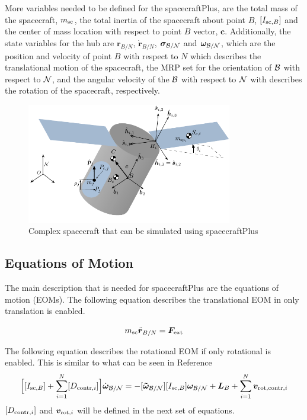 More variables needed to be defined for the spacecraftPlus, are the total mass of the spacecraft, $m_{\textnormal{sc}}$, the total inertia of the spacecraft about point $B$,  $[I_{\textnormal{sc},B}]$ and the center of mass location with respect to point $B$ vector, $\bm c$. Additionally, the state variables for the hub are $\bm r_{B/N}$, $\dot{\bm r}_{B/N}$, $\bm \sigma_{\cal{B}/\cal{N}}$ and $\bm \omega_{\cal{B}/\cal{N}}$, which are the position and velocity of point $B$ with respect to $N$ which describes the translational motion of the spacecraft, the MRP set for the orientation of $\cal{B}$ with respect to $\cal{N}$, and the angular velocity of the $\cal{B}$ with respect to $\cal{N}$ with describes the rotation of the spacecraft, respectively. 


\begin{figure}[htbp]
	\centerline{
		\includegraphics[width=0.8\textwidth]{Figures/Flex_Slosh_Figure}}
	\caption{Complex spacecraft that can be simulated using spacecraftPlus}
	\label{fig:FlexSloshFigure}
\end{figure}

\subsection{Equations of Motion}

The main description that is needed for spacecraftPlus are the equations of motion (EOMs). The following equation describes the translational EOM in only translation is enabled.

\begin{equation}
m_{\text{sc}} \ddot{\bm r}_{B/N} = \bm F_{\textnormal{ext}}
\label{eq:Rbddot3}
\end{equation}

The following equation describes the rotational EOM if only rotational is enabled. This is similar to what can be seen in Reference~\cite{schaub} 
\begin{equation}
\Big[[I_{\text{sc},B}]+\sum\limits_{i=1}^{N} [D_{\textnormal{contr},i}]\Big] \dot{\bm\omega}_{\cal B/N} = - [\bm{\tilde{\omega}}_{\cal B/N}] [I_{\text{sc},B}] \bm\omega_{\cal B/N} + \bm{L}_B +\sum\limits_{i=1}^{N} \bm v_{\textnormal{rot,contr},i}
	\label{eq:Final6}
\end{equation}
$[D_{\textnormal{contr},i}]$ and $\bm v_{\textnormal{rot},i}$ will be defined in the next set of equations. 

